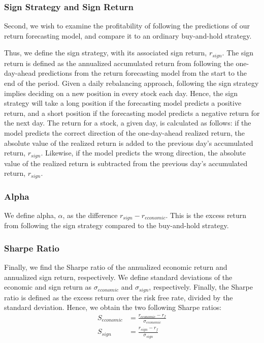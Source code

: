 \subsubsection{Sign Strategy and Sign Return}
Second, we wish to examine the profitability of following the predictions of our return forecasting model, and compare it to an ordinary buy-and-hold strategy. 

Thus, we define the sign strategy, with its associated sign return, $r_{sign}$. The sign return is defined as the annualized accumulated return from following the one-day-ahead predictions from the return forecasting model from the start to the end of the period. Given a daily rebalancing approach, following the sign strategy implies deciding on a new position in every stock each day. Hence, the sign strategy will take a long position if the forecasting model predicts a positive return, and a short position if the forecasting model predicts a negative return for the next day. The return for a stock, a given day, is calculated as follows: if the model predicts the correct direction of the one-day-ahead realized return, the absolute value of the realized return is added to the previous day's accumulated return, $r_{sign}$. Likewise, if the model predicts the wrong direction, the absolute value of the realized return is subtracted from the previous day's accumulated return, $r_{sign}$. 

\subsubsection{Alpha}
We define alpha, $\alpha$, as the difference $r_{sign}-r_{economic}$. This is the excess return from following the sign strategy compared to the buy-and-hold strategy. 

\subsubsection{Sharpe Ratio}
Finally, we find the Sharpe ratio of the annualized economic return and annualized sign return, respectively. We define standard deviations of the economic and sign return as $\sigma_{economic}$ and $\sigma_{sign}$, respectively. Finally, the Sharpe ratio is defined as the excess return over the risk free rate, divided by the standard deviation. Hence, we obtain the two following Sharpe ratios:
\begin{align}
    S_{economic} &= \frac{r_{economic}-r_f}{\sigma_{economic}} \\
    S_{sign} &= \frac{r_{sign}-r_f}{\sigma_{sign}}
\end{align}
